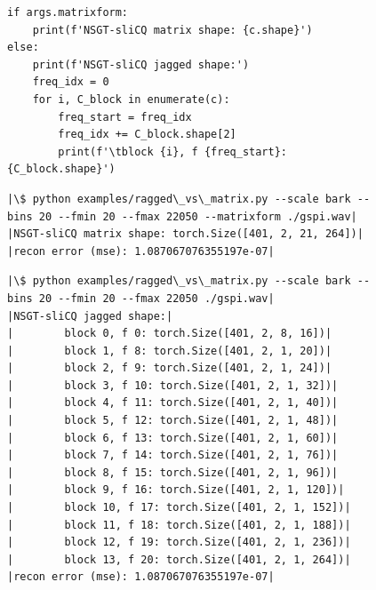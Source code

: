 \documentclass[report.tex]{subfiles}
\begin{document}
\begin{figure}[h]
  \centering
 \begin{minipage}{\textwidth}
  \centering
\setlength\partopsep{-\topsep}
\begin{verbatim}
if args.matrixform:
    print(f'NSGT-sliCQ matrix shape: {c.shape}')
else:
    print(f'NSGT-sliCQ jagged shape:')
    freq_idx = 0
    for i, C_block in enumerate(c):
        freq_start = freq_idx
        freq_idx += C_block.shape[2]
        print(f'\tblock {i}, f {freq_start}: {C_block.shape}')
\end{verbatim}
 \vspace{1em}
 \end{minipage}
 \begin{minipage}{\textwidth}
  \centering
\begin{verbatim}
|\$ python examples/ragged\_vs\_matrix.py --scale bark --bins 20 --fmin 20 --fmax 22050 --matrixform ./gspi.wav|
|NSGT-sliCQ matrix shape: torch.Size([401, 2, 21, 264])|
|recon error (mse): 1.087067076355197e-07|
\end{verbatim}
 \vspace{1em}
 \end{minipage}
\begin{minipage}{\textwidth}
  \centering
\begin{verbatim}
|\$ python examples/ragged\_vs\_matrix.py --scale bark --bins 20 --fmin 20 --fmax 22050 ./gspi.wav|
|NSGT-sliCQ jagged shape:|
|        block 0, f 0: torch.Size([401, 2, 8, 16])|
|        block 1, f 8: torch.Size([401, 2, 1, 20])|
|        block 2, f 9: torch.Size([401, 2, 1, 24])|
|        block 3, f 10: torch.Size([401, 2, 1, 32])|
|        block 4, f 11: torch.Size([401, 2, 1, 40])|
|        block 5, f 12: torch.Size([401, 2, 1, 48])|
|        block 6, f 13: torch.Size([401, 2, 1, 60])|
|        block 7, f 14: torch.Size([401, 2, 1, 76])|
|        block 8, f 15: torch.Size([401, 2, 1, 96])|
|        block 9, f 16: torch.Size([401, 2, 1, 120])|
|        block 10, f 17: torch.Size([401, 2, 1, 152])|
|        block 11, f 18: torch.Size([401, 2, 1, 188])|
|        block 12, f 19: torch.Size([401, 2, 1, 236])|
|        block 13, f 20: torch.Size([401, 2, 1, 264])|
|recon error (mse): 1.087067076355197e-07|
\end{verbatim}
 \vspace{1em}
 \end{minipage}
  \label{code:raggedvmatrix}
\end{figure}
\end{document}
